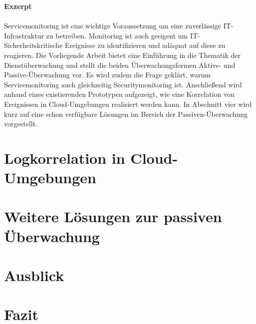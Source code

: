 \documentclass[a4paper,10pt]{scrreprt}
\begin{document}
\vspace*{\fill}
\textbf{Exzerpt}\\\\
    Servicemonitoring ist eine wichtige Voraussetzung um eine zuverlässige 
    IT-Infrastruktur zu betreiben. Monitoring ist auch geeigent um IT-Sicherheitskritische
    Ereignisse zu identifizieren und adäquat auf diese zu reagieren. Die Vorliegende
    Arbeit bietet eine Einführung in die Thematik der Dienstüberwachung und stellt die
    beiden Überwachungsformen Aktive- und Passive-Überwachung vor. Es wird zudem
    die Frage geklärt, warum Servicemonitoring auch gleichzeitig Securitymonitoring ist.
    Anschließend wird
    anhand eines existierenden Prototypen aufgezeigt, wie eine Korrelation von 
    Ereignissen in Cloud-Umgebungen realisiert werden kann. In Abschnitt vier wird
    kurz auf eine schon verfügbare Lösungen im Bereich der Passiven-Überwachung 
    vorgestellt. 
\vspace*{\fill}


\tableofcontents
\thispagestyle{fancy}


\cleardoubleemptypage

\chapter{Logkorrelation in Cloud-Umgebungen}
\thispagestyle{fancy}

\chapter{Weitere Lösungen zur passiven Überwachung}\label{elk}
\thispagestyle{fancy}

\chapter{Ausblick}
\thispagestyle{fancy}

\chapter{Fazit}
\thispagestyle{fancy}

{}

{\small \listoffigures}
\end{document}
